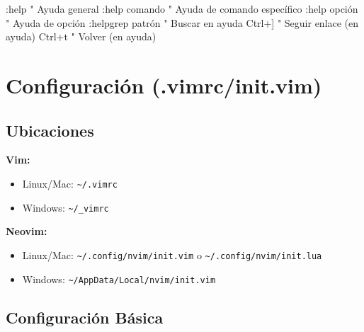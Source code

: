 \documentclass[
  doc,
  floatsintext,
  longtable,
  a4paper,
  nolmodern,
  notxfonts,
  notimes,
  12pt,
  colorlinks=true,linkcolor=blue,citecolor=blue,urlcolor=blue]{apa7}
\newenvironment{Shaded}{\begin{snugshade}}{\end{snugshade}}
\newcommand{\NormalTok}[1]{\textcolor[rgb]{0.00,0.23,0.31}{#1}}
\providecommand{\tightlist}{%
  \setlength{\itemsep}{0pt}\setlength{\parskip}{0pt}}
\begin{document}
\begin{Shaded}
\begin{Highlighting}[]
\NormalTok{:help            " Ayuda general}
\NormalTok{:help comando    " Ayuda de comando específico}
\NormalTok{:help \textquotesingle{}opción\textquotesingle{}   " Ayuda de opción}
\NormalTok{:helpgrep patrón " Buscar en ayuda}
\NormalTok{Ctrl+]           " Seguir enlace (en ayuda)}
\NormalTok{Ctrl+t           " Volver (en ayuda)}
\end{Highlighting}
\end{Shaded}

\section{Configuración
(.vimrc/init.vim)}\label{configuraciuxf3n-.vimrcinit.vim}

\subsection{Ubicaciones}\label{ubicaciones}

\textbf{Vim:}

\begin{itemize}
\tightlist
\item
  Linux/Mac: \texttt{\textasciitilde{}/.vimrc}
\item
  Windows: \texttt{\textasciitilde{}/\_vimrc}
\end{itemize}

\textbf{Neovim:}

\begin{itemize}
\tightlist
\item
  Linux/Mac: \texttt{\textasciitilde{}/.config/nvim/init.vim} o
  \texttt{\textasciitilde{}/.config/nvim/init.lua}
\item
  Windows: \texttt{\textasciitilde{}/AppData/Local/nvim/init.vim}
\end{itemize}

\subsection{Configuración Básica}\label{configuraciuxf3n-buxe1sica}
\end{document}
